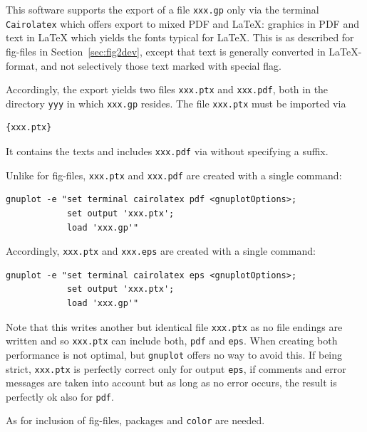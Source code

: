 This software supports the export of a file \texttt{xxx.gp} 
only via the terminal \texttt{Cairolatex} 
which offers export to mixed PDF and \LaTeX\@: 
graphics in PDF and text in \LaTeX{}
which yields the fonts typical for \LaTeX. 
This is as described for fig-files in Section~\ref{sec:fig2dev}, 
except that text is generally converted in \LaTeX{}-format, 
and not selectively those text marked with special flag. 

Accordingly, the export yields two files \texttt{xxx.ptx} and
\texttt{xxx.pdf}, both in the directory \texttt{yyy} 
in which \texttt{xxx.gp} resides. 
The file \texttt{xxx.ptx} must be imported via 
%
\begin{lstlisting}[language=TeX]
{xxx.ptx}
\end{lstlisting}
%
It contains the texts and includes \texttt{xxx.pdf} 
via  without specifying a suffix. 

Unlike for fig-files, 
\texttt{xxx.ptx} and \texttt{xxx.pdf} are created with a single command: 
%
\begin{verbatim}
gnuplot -e "set terminal cairolatex pdf <gnuplotOptions>;
            set output 'xxx.ptx';
            load 'xxx.gp'"
\end{verbatim}

Accordingly, 
\texttt{xxx.ptx} and \texttt{xxx.eps} are created with a single command: 
%
\begin{verbatim}
gnuplot -e "set terminal cairolatex eps <gnuplotOptions>;
            set output 'xxx.ptx';
            load 'xxx.gp'"
\end{verbatim}
%
Note that this writes another but identical file \texttt{xxx.ptx} 
as no file endings are written 
and so \texttt{xxx.ptx} can include both, \texttt{pdf} and \texttt{eps}. 
When creating both performance is not optimal, 
but \texttt{gnuplot} offers no way to avoid this. 
If being strict, 
\texttt{xxx.ptx} is perfectly correct only for output \texttt{eps},
if comments and error messages are taken into account 
but as long as no error occurs, 
the result is perfectly ok also for \texttt{pdf}. 

As for inclusion of fig-files, 
packages  and \texttt{color} are needed. 



